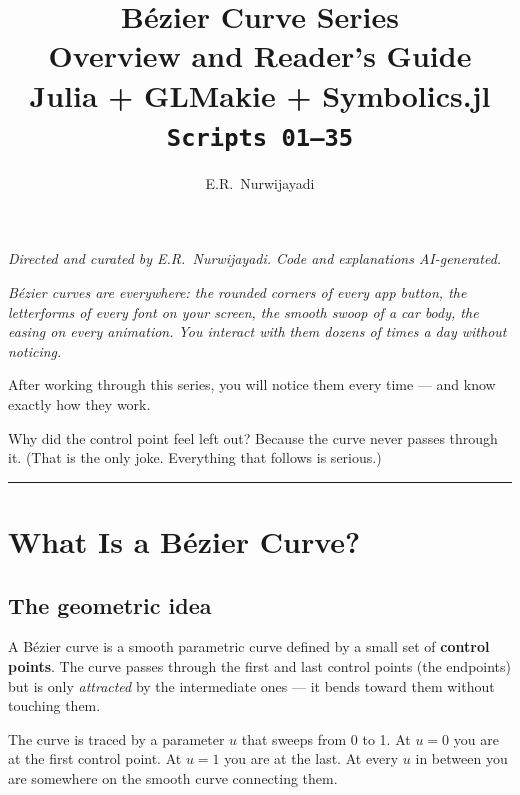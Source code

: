 \documentclass[12pt, a4paper]{article}
\title{%
  \vspace{1cm}
  {\LARGE\bfseries B\'ezier Curve Series}\\[0.4em]
  {\large Overview and Reader's Guide}\\[0.4em]
  {\normalsize Julia + GLMakie + Symbolics.jl}\\[0.4em]
  {\normalsize\texttt{Scripts 01--35}}
}
\author{E.R.\ Nurwijayadi}
\date{\DTMtoday}
\begin{document}
\maketitle
\thispagestyle{empty}

\begin{center}
\textit{Directed and curated by E.R.\ Nurwijayadi.
Code and explanations AI-generated.}
\end{center}

\vspace{0.5em}
\begin{center}
\begin{minipage}{0.82\textwidth}
\small\itshape
B\'ezier curves are everywhere: the rounded corners of
every app button, the letterforms of every font on your
screen, the smooth swoop of a car body, the easing on
every animation.
You interact with them dozens of times a day without
noticing.

After working through this series, you will notice them
every time --- and know exactly how they work.

Why did the control point feel left out?
Because the curve never passes through it.
(That is the only joke.
Everything that follows is serious.)
\end{minipage}
\end{center}

\vspace{1em}\hrule\vspace{1.5em}
\tableofcontents
\newpage


\section{What Is a B\'ezier Curve?}

\subsection{The geometric idea}

A B\'ezier curve is a smooth parametric curve defined by
a small set of \textbf{control points}.
The curve passes through the first and last control points
(the endpoints) but is only \emph{attracted} by the
intermediate ones --- it bends toward them without
touching them.

The curve is traced by a parameter $u$ that sweeps from
0 to 1.
At $u = 0$ you are at the first control point.
At $u = 1$ you are at the last.
At every $u$ in between you are somewhere on the smooth
curve connecting them.
\end{document}
